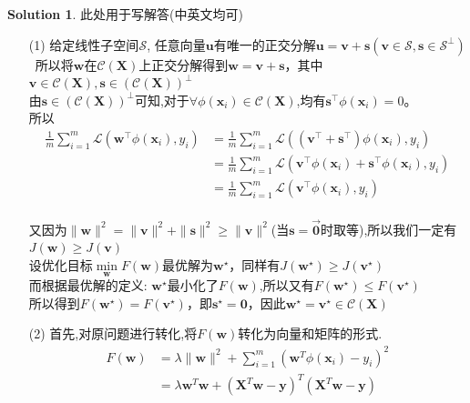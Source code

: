 \documentclass[a4paper,UTF8]{article}
\numberwithin{equation}{section}
\theoremstyle{definition}
\newtheorem*{solution}{Solution}
\def \w {\boldsymbol{w}}
\def \u {\boldsymbol{u}}
\def \v {\boldsymbol{v}}
\def \s {\boldsymbol{s}}
\def \x {\boldsymbol{x}}
\begin{document}
\begin{solution}
	此处用于写解答(中英文均可)
\begin{enumerate}
    \item [(1)]给定线性子空间$\mathcal{S}$, 任意向量$\u$有唯一的正交分解$\u = \v + \s(\v \in \mathcal{S}, \s \in \mathcal{S}^{\perp})$\ 所以将$\w$在$\mathcal{C}(\bm{X})$上正交分解得到$\bm{w}=\bm{v}+\bm{s}$，其中$\bm{v}\in\mathcal{C}(\bm{X}), \bm{s}\in(\mathcal{C}(\bm{X}))^\bot$\\
    由$\bm{s}\in(\mathcal{C}(\bm{X}))^\bot$可知,对于$\forall \phi(\bm{x}_i)\in\mathcal{C}(\bm{X})$,均有$\bm{s}^\top\phi(\bm{x}_i)=0$\vspace{11pt}。\\
    所以
    \begin{align*}
        \frac1{m}\sum_{i=1}^m{\mathcal{L}(\bm{w}^\top\phi(\bm{x}_i),y_i)}
        &=\frac1{m}\sum_{i=1}^m{\mathcal{L}((\bm{v}^\top+\bm{s}^\top)\phi(\bm{x}_i),y_i)}\\
        &=\frac1{m}\sum_{i=1}^m{\mathcal{L}(\bm{v}^\top\phi(\bm{x}_i)+\bm{s}^\top\phi(\bm{x}_i),y_i)}\\
        &=\frac1{m}\sum_{i=1}^m{\mathcal{L}(\bm{v}^\top\phi(\bm{x}_i),y_i)}
    \end{align*}\\
    又因为$\|\bm{w}\|^2=\|\bm{v}\|^2+\|\bm{s}\|^2\geq\|\bm{v}\|^2$(当$\bm{s}=\overrightarrow{\bm{0}}$时取等),所以我们一定有$J(\bm{w})\geq J(\bm{v})$\\
    设优化目标$\min\limits_{\bm{w}}F(\bm{w})$最优解为$\bm{w}^\star$，同样有$J(\bm{w}^\star)\geq J(\bm{v}^\star)$\\
    而根据最优解的定义: $\bm{w}^\star$最小化了$F(\bm{w})$,所以又有$F(\bm{w}^\star)\leq F(\bm{v}^\star)$\\
    所以得到$F(\bm{w}^\star)=F(\bm{v}^\star)$，即$\bm{s}^\star=\bm{0}$，因此$\bm{w}^\star=\bm{v}^\star\in\mathcal{C}(\bm{X})$
    
    \item [(2)] 
    首先,对原问题进行转化,将$F(\bm{w})$转化为向量和矩阵的形式.\\
    \begin{align*}
        F(\w) &= \lambda\|\w\|^2+\sum_{i=1}^m\left(\w^T\phi(\x_i)-y_i\right)^2\\
              &= \lambda\bm{w}^T\bm{w}+ (\mathbf{X}^T \bm{w} - \bm{y})^T(\mathbf{X}^T\bm{w}-\bm{y})
    \end{align*}


\end{enumerate}
\end{solution}
\end{document}
